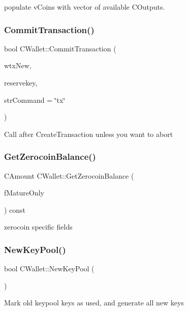 populate v\+Coins with vector of available C\+Outputs. \mbox{\label{group___actions_gaa13fbeaebd271f910a54cc5b82d73fde}} 
\subsubsection{\texorpdfstring{Commit\+Transaction()}{CommitTransaction()}}
{\footnotesize\ttfamily bool C\+Wallet\+::\+Commit\+Transaction (\begin{DoxyParamCaption}\item[{\mbox{\hyperlink{class_c_wallet_tx}{C\+Wallet\+Tx}} \&}]{wtx\+New,  }\item[{\mbox{\hyperlink{class_c_reserve_key}{C\+Reserve\+Key}} \&}]{reservekey,  }\item[{std\+::string}]{str\+Command = {\ttfamily \char`\"{}tx\char`\"{}} }\end{DoxyParamCaption})}

Call after Create\+Transaction unless you want to abort \mbox{\label{group___actions_gaba22138d6c6eabe35feed7570a78ee7d}} 
\subsubsection{\texorpdfstring{Get\+Zerocoin\+Balance()}{GetZerocoinBalance()}}
{\footnotesize\ttfamily C\+Amount C\+Wallet\+::\+Get\+Zerocoin\+Balance (\begin{DoxyParamCaption}\item[{bool}]{f\+Mature\+Only }\end{DoxyParamCaption}) const}

zerocoin specific fields \mbox{\label{group___actions_ga7353ba1e79fc4167fbfbe79b41698fa7}} 
\subsubsection{\texorpdfstring{New\+Key\+Pool()}{NewKeyPool()}}
{\footnotesize\ttfamily bool C\+Wallet\+::\+New\+Key\+Pool (\begin{DoxyParamCaption}{ }\end{DoxyParamCaption})}

Mark old keypool keys as used, and generate all new keys 